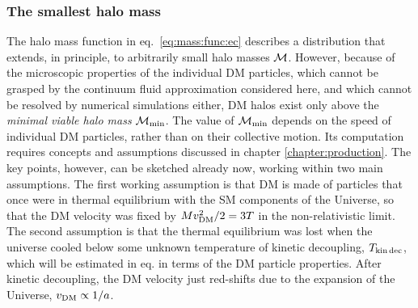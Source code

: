 \subsubsection*{The smallest halo mass}
The halo mass function in eq.~\eqref{eq:mass:func:ec}
describes a distribution that extends, in principle, to arbitrarily small halo masses ${\mathcal{M}}$. 
However, because of the microscopic properties of the individual DM particles, which cannot be grasped by the continuum 
fluid approximation considered here, and which cannot be resolved by numerical simulations either, 
DM halos exist only above the {\em minimal viable halo mass} ${\mathcal{M}}_{\rm min}$. 
The value of ${\mathcal{M}}_{\rm min}$ 
 depends on the speed of individual DM particles, rather than on their collective motion.
Its computation requires concepts and assumptions discussed in chapter \ref{chapter:production}.
The key points, however, can be sketched already now, working within two main assumptions.
The first working assumption is that DM is made of particles that once were in thermal equilibrium with the SM components of the Universe, 
so that the DM velocity was fixed by $M v_{\rm DM}^2/2=3T$ in the non-relativistic limit.
The second assumption is  that the thermal equilibrium was lost when the universe cooled below 
some unknown temperature of  kinetic decoupling, $T_{\rm kin\,dec}$, which
will be estimated  in eq. in terms of the DM particle properties.
After kinetic decoupling, the DM velocity just red-shifts due to the expansion of the Universe, $ v_{\rm DM}  \propto 1/a$.

